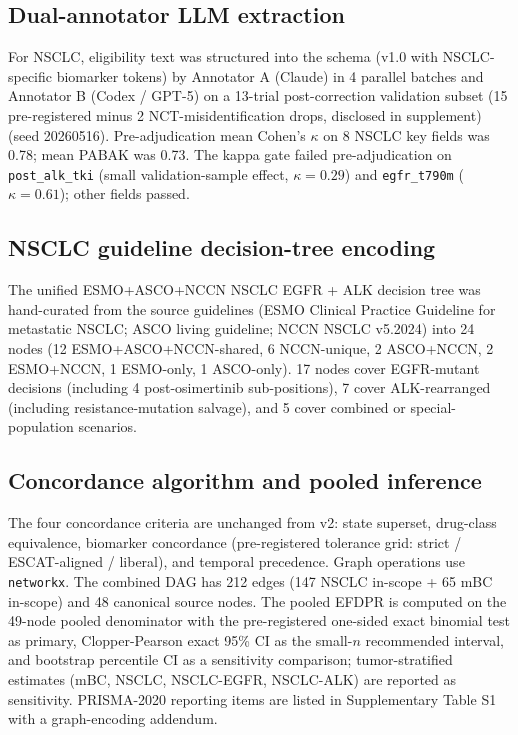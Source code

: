 \documentclass[11pt,a4paper]{article}
\begin{document}
\subsection{Dual-annotator LLM extraction}
For NSCLC, eligibility text was structured into the schema (v1.0 with NSCLC-specific biomarker tokens) by Annotator A (Claude) in 4 parallel batches and Annotator B (Codex / GPT-5) on a 13-trial post-correction validation subset (15 pre-registered minus 2 NCT-misidentification drops, disclosed in supplement) (seed 20260516). Pre-adjudication mean Cohen's $\kappa$\citep{cohen1960kappa} on 8 NSCLC key fields was 0.78; mean PABAK\citep{byrt1993pabak,viera2005} was 0.73. The kappa gate failed pre-adjudication on \texttt{post\_alk\_tki} (small validation-sample effect, $\kappa = 0.29$) and \texttt{egfr\_t790m} ($\kappa = 0.61$); other fields passed.

\subsection{NSCLC guideline decision-tree encoding}
The unified ESMO+ASCO+NCCN NSCLC EGFR + ALK decision tree was hand-curated from the source guidelines (ESMO Clinical Practice Guideline for metastatic NSCLC; ASCO living guideline; NCCN NSCLC v5.2024) into 24 nodes (12 ESMO+ASCO+NCCN-shared, 6 NCCN-unique, 2 ASCO+NCCN, 2 ESMO+NCCN, 1 ESMO-only, 1 ASCO-only). 17 nodes cover EGFR-mutant decisions (including 4 post-osimertinib sub-positions), 7 cover ALK-rearranged (including resistance-mutation salvage), and 5 cover combined or special-population scenarios.

\subsection{Concordance algorithm and pooled inference}
The four concordance criteria are unchanged from v2: state superset, drug-class equivalence, biomarker concordance (pre-registered tolerance grid: strict / ESCAT-aligned\citep{mateo2018escat} / liberal), and temporal precedence. Graph operations use \texttt{networkx}.\citep{hagberg2008networkx} The combined DAG has 212 edges (147 NSCLC in-scope + 65 mBC in-scope) and 48 canonical source nodes. The pooled EFDPR is computed on the 49-node pooled denominator with the pre-registered one-sided exact binomial test as primary, Clopper-Pearson exact 95\% CI\citep{clopper1934} as the small-$n$ recommended interval, and bootstrap percentile CI\citep{efron1979bootstrap} as a sensitivity comparison; tumor-stratified estimates (mBC, NSCLC, NSCLC-EGFR, NSCLC-ALK) are reported as sensitivity. PRISMA-2020 reporting items\citep{moher2020prisma} are listed in Supplementary Table S1 with a graph-encoding addendum.
\end{document}
